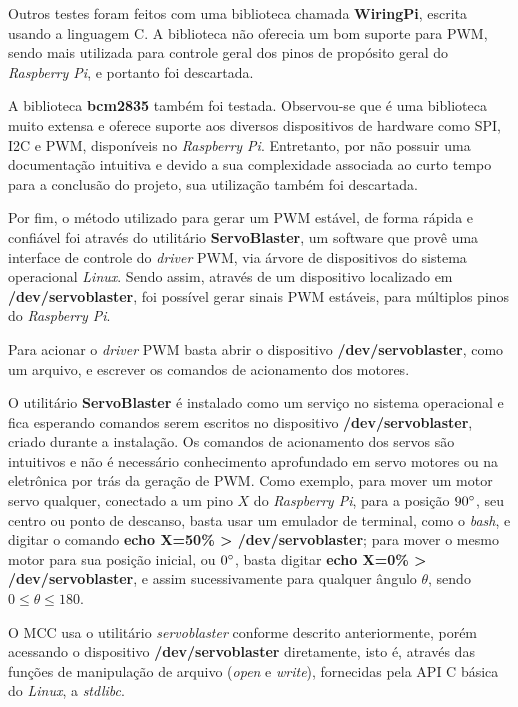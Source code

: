 Outros testes foram feitos com uma biblioteca chamada \textbf{WiringPi}, escrita usando a linguagem C. A biblioteca não oferecia um bom suporte para PWM, sendo mais utilizada para controle geral dos pinos de propósito geral do \textit{Raspberry Pi}, e portanto foi descartada.\par

A biblioteca \textbf{bcm2835} também foi testada. Observou-se que é uma biblioteca muito extensa e oferece suporte aos diversos dispositivos de hardware como SPI, I2C e PWM, disponíveis no \textit{Raspberry Pi}. Entretanto, por não possuir uma documentação intuitiva e devido a sua complexidade associada ao curto tempo para a conclusão do projeto, sua utilização também foi descartada.\par

Por fim, o método utilizado para gerar um PWM estável, de forma rápida e confiável foi através do utilitário \textbf{ServoBlaster}, um software que provê uma interface de controle do \textit{driver} PWM, via árvore de dispositivos do sistema operacional \textit{Linux}. Sendo assim, através de um dispositivo localizado em \textbf{/dev/servoblaster}, foi possível gerar sinais PWM estáveis, para múltiplos pinos do \textit{Raspberry Pi}.\par 

Para acionar o \textit{driver} PWM basta abrir o dispositivo \textbf{/dev/servoblaster}, como um arquivo, e escrever os comandos de acionamento dos motores.\par

O utilitário \textbf{ServoBlaster} é instalado como um serviço no sistema operacional e fica esperando comandos serem escritos no dispositivo \textbf{/dev/servoblaster}, criado durante a instalação. Os comandos de acionamento dos servos são intuitivos e não é necessário conhecimento aprofundado em servo motores ou na eletrônica por trás da geração de PWM. Como exemplo, para mover um motor servo qualquer, conectado a um pino $X$ do \textit{Raspberry Pi}, para a posição $90\degree$, seu centro ou ponto de descanso, basta usar um emulador de terminal, como o \textit{bash}, e digitar o comando \textbf{echo X=50\% > /dev/servoblaster}; para mover o mesmo motor para sua posição inicial, ou $0\degree$, basta digitar \textbf{echo X=0\% > /dev/servoblaster}, e assim sucessivamente para qualquer ângulo $\theta$, sendo $0 \le \theta \le 180$.\par

O MCC usa o utilitário \textit{servoblaster} conforme descrito anteriormente, porém acessando o dispositivo \textbf{/dev/servoblaster} diretamente, isto é, através das funções de manipulação de arquivo (\textit{open} e \textit{write}), fornecidas pela API C básica do \textit{Linux}, a \textit{stdlibc}.


